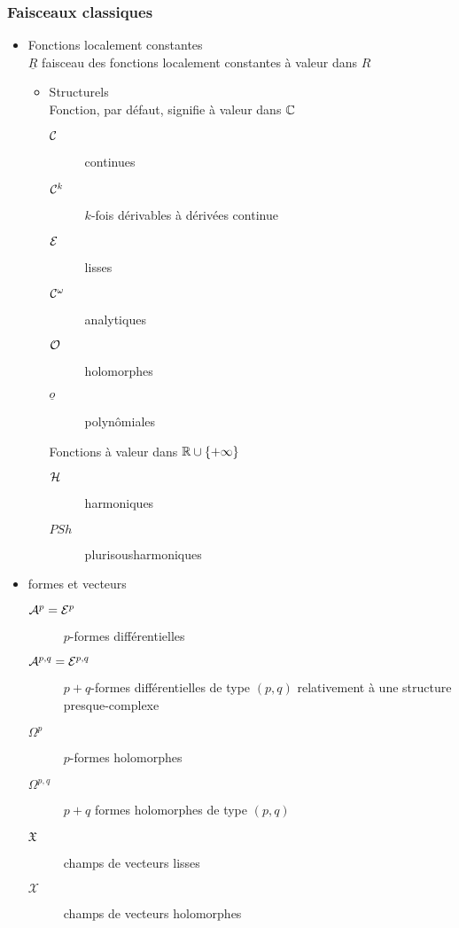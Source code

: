 \documentclass[12pt,makeidx]{amsart}
\begin{document}
\subsubsection{Faisceaux classiques}
\label{sec-1-1-1}
\begin{itemize}

\item Fonctions localement constantes\\
\label{sec-1-1-1-1}%
$\underline{R}$ faisceau des fonctions localement constantes à valeur dans $R$
\begin{itemize}

\item Structurels\\
\label{sec-1-1-1-1-1}%
Fonction, par défaut, signifie à valeur dans $\mathbb{C}$

\begin{description}
\item[$\mathcal{C}$] continues
\item[$\mathcal{C}^k$] $k$-fois dérivables à dérivées continue
\item[$\mathcal{E}$] lisses
\item[$\mathcal{C}^\omega$] analytiques
\item[$\mathcal{O}$] holomorphes
\item[$\underline{o}$] polynômiales
\end{description}


Fonctions à valeur dans $\mathbb{R} \cup \{+\infty\}$

\begin{description}
\item[$\mathcal{H}$] harmoniques
\item[$PSh$] plurisousharmoniques
\end{description}

\end{itemize} %

\item formes et vecteurs\\
\label{sec-1-1-1-2}%
\begin{description}
\item[$\mathcal{A}^p = \mathcal{E}^p$] $p$-formes différentielles
\item[$\mathcal{A}^{p,q} = \mathcal{E}^{p,q}$] $p+q$-formes différentielles de type $(p,q)$ relativement à une structure presque-complexe
\item[$\Omega^p$] $p$-formes holomorphes
\item[$\Omega^{p,q}$] $p+q$ formes holomorphes de type $(p,q)$
\item[$\mathfrak{X}$] champs de vecteurs lisses
\item[$\mathcal{X}$] champs de vecteurs holomorphes
\end{description}


\end{itemize}
\end{document}
